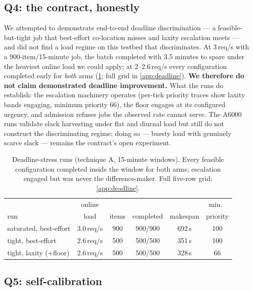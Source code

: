 \documentclass[conference]{IEEEtran}
\begin{document}
\subsection{Q4: the contract, honestly}
\label{sec:contract-eval}

We attempted to demonstrate end-to-end deadline discrimination --- a feasible-but-tight
job that best-effort co-location misses and laxity escalation meets --- and did not find
a load regime on this testbed that discriminates. At 3\,req/s with a 900-item/15-minute
job, the batch completed with 3.5 minutes to spare under the heaviest online load we
could apply; at 2--2.6\,req/s every configuration completed early for \emph{both} arms
(\cref{tab:deadline}; full grid in \cref{app:deadline}). \textbf{We therefore do not
claim demonstrated deadline improvement.} What the runs do establish: the escalation
machinery operates (per-tick priority traces show laxity bands engaging, minimum priority
66), the floor engages at its configured urgency, and admission refuses jobs the observed
rate cannot serve. The A6000 runs validate slack harvesting under flat and diurnal load
but still do not construct the discriminating regime; doing so --- bursty load with
genuinely scarce slack --- remains the contract's open experiment.

\begin{table}[t]
\centering
\small
\caption{Deadline-stress runs (technique A, 15-minute windows). Every feasible
configuration completed inside the window for both arms; escalation engaged but was
never the difference-maker. Full five-row grid: \cref{app:deadline}.}
\label{tab:deadline}
\setlength{\tabcolsep}{3.2pt}
\footnotesize
\begin{tabular}{lccccc}
\toprule
 & online & & & & min.\ \\
run & load & items & completed & makespan & priority \\
\midrule
saturated, best-effort & 3.0\,req/s & 900 & 900/900 & 692\,s & 100 \\
tight, best-effort     & 2.6\,req/s & 500 & 500/500 & 351\,s & 100 \\
tight, laxity (+floor) & 2.6\,req/s & 500 & 500/500 & 328\,s & 66 \\
\bottomrule
\end{tabular}
\end{table}

\subsection{Q5: self-calibration}
\label{sec:tech-b-eval}
\end{document}
